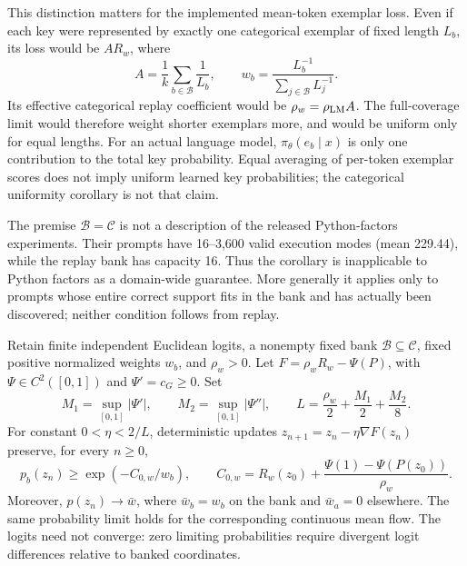 This distinction matters for the implemented mean-token exemplar loss.
Even if each key were represented by exactly one categorical exemplar of
fixed length $L_b$, its loss would be $A R_w$, where
\[
 A=\frac1k\sum_{b\in\mathcal B}\frac1{L_b},\qquad
 w_b=\frac{L_b^{-1}}{\sum_{j\in\mathcal B}L_j^{-1}}.
\]
Its effective categorical replay coefficient would be $\rho_w=\rho_{\rm LM}A$.
The full-coverage limit would therefore weight shorter exemplars more, and
would be uniform only for equal lengths. For an actual language model,
$\pi_\theta(e_b\mid x)$ is only one contribution to the total key probability.
Equal averaging of per-token exemplar scores does not imply uniform learned
key probabilities; the categorical uniformity corollary is not that claim.

The premise $\mathcal B=\mathcal C$ is not a description of the released
Python-factors experiments. Their prompts have 16--3,600 valid execution modes
(mean 229.44), while the replay bank has capacity 16. Thus the corollary is
inapplicable to Python factors as a domain-wide guarantee. More generally it
applies only to prompts whose entire correct support fits in the bank and has
actually been discovered; neither condition follows from replay.

\begin{lemma}
\label{lem:replay-finite-steps}
Retain finite independent Euclidean logits, a nonempty fixed bank
$\mathcal B\subseteq\mathcal C$, fixed positive normalized weights $w_b$,
and $\rho_w>0$. Let $F=\rho_wR_w-\Psi(P)$, with
$\Psi\in C^2([0,1])$ and $\Psi'=c_G\ge0$. Set
\[
 M_1=\sup_{[0,1]}|\Psi'|,\qquad
 M_2=\sup_{[0,1]}|\Psi''|,\qquad
 L=\frac{\rho_w}{2}+\frac{M_1}{2}+\frac{M_2}{8}.
\]
For constant $0<\eta<2/L$, deterministic updates
$z_{n+1}=z_n-\eta\nabla F(z_n)$ preserve, for every $n\ge0$,
\[
 p_b(z_n)\ge \exp(-C_{0,w}/w_b),\qquad
 C_{0,w}=R_w(z_0)+\frac{\Psi(1)-\Psi(P(z_0))}{\rho_w}.
\]
Moreover, $p(z_n)\to\bar w$, where $\bar w_b=w_b$ on the bank and
$\bar w_a=0$ elsewhere. The same probability limit holds for the corresponding
continuous mean flow. The logits need not converge: zero limiting probabilities require divergent logit differences relative to banked coordinates.
\end{lemma}

